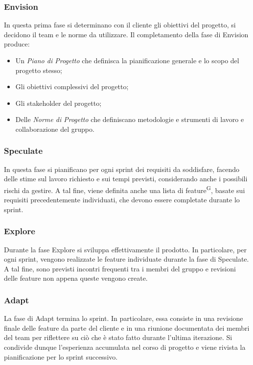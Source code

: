 \subsubsection{Envision}\label{sec:modello_sviluppo:agile:envision}
In questa prima fase si determinano con il cliente gli obiettivi del progetto, si decidono il team e le norme da utilizzare.
Il completamento della fase di Envision produce:
\begin{itemize}
    \item Un \textit{Piano di Progetto} che definisca la pianificazione generale e lo scopo del progetto stesso;
    \item Gli obiettivi complessivi del progetto;
    \item Gli stakeholder del progetto;
    \item Delle \textit{Norme di Progetto} che definiscano metodologie e strumenti di lavoro e collaborazione del gruppo.
\end{itemize}

\subsubsection{Speculate}\label{sec:modello_sviluppo:agile:speculate}
In questa fase si pianificano per ogni sprint dei requisiti da soddisfare, facendo delle stime sul lavoro richiesto e sui tempi previsti, considerando anche i possibili rischi da gestire. %
A tal fine, viene definita anche una lista di feature\textsuperscript{G}, basate sui requisiti precedentemente individuati, che devono essere completate durante lo sprint.

\subsubsection{Explore}\label{sec:modello_sviluppo:agile:explore}
Durante la fase Explore si sviluppa effettivamente il prodotto. In particolare, per ogni sprint, vengono realizzate le feature individuate durante la fase di Speculate. A tal fine, sono previsti incontri frequenti tra i membri del gruppo e revisioni delle feature non appena queste vengono create.


\subsubsection{Adapt}\label{sec:modello_sviluppo:agile:adapt}
La fase di Adapt termina lo sprint. In particolare, essa consiste in una revisione finale delle feature da parte del cliente e in una riunione documentata dei membri del team per riflettere su ciò che è stato fatto durante l'ultima iterazione. Si condivide dunque l'esperienza accumulata nel corso di progetto e viene rivista la pianificazione per lo sprint successivo.

